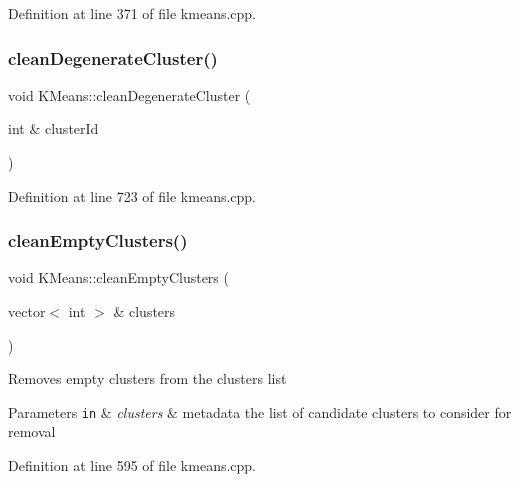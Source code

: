 Definition at line 371 of file kmeans.\+cpp.

\mbox{\label{class_k_means_a0004047b206790fee820d57e4b76e9c6}} 
\subsubsection{\texorpdfstring{clean\+Degenerate\+Cluster()}{cleanDegenerateCluster()}}
{\footnotesize\ttfamily void K\+Means\+::clean\+Degenerate\+Cluster (\begin{DoxyParamCaption}\item[{int \&}]{cluster\+Id }\end{DoxyParamCaption})}



Definition at line 723 of file kmeans.\+cpp.

\mbox{\label{class_k_means_a127c22c2118c8ac22b84a3d2fe01dbf2}} 
\subsubsection{\texorpdfstring{clean\+Empty\+Clusters()}{cleanEmptyClusters()}}
{\footnotesize\ttfamily void K\+Means\+::clean\+Empty\+Clusters (\begin{DoxyParamCaption}\item[{vector$<$ int $>$ \&}]{clusters }\end{DoxyParamCaption})}

Removes empty clusters from the clusters list


\begin{DoxyParams}[1]{Parameters}
\mbox{\tt in}  & {\em clusters} & metadata the list of candidate clusters to consider for removal \\
\hline
\end{DoxyParams}


Definition at line 595 of file kmeans.\+cpp.

\mbox{\label{class_k_means_a280557e55db230a66b5f89c284c88310}} 
